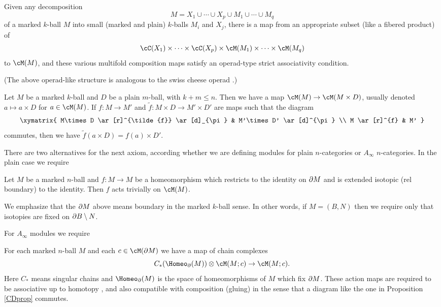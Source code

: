 {Given any decomposition 
\[
	M =  X_1 \cup\cdots\cup X_p \cup M_1\cup\cdots\cup M_q
\]
of a marked $k$-ball $M$
into small (marked and plain) $k$-balls $M_i$ and $X_j$, there is a 
map from an appropriate subset (like a fibered product) 
of 
\[
	\cC(X_1)\times\cdots\times\cC(X_p) \times \cM(M_1)\times\cdots\times\cM(M_q) 
\]
to $\cM(M)$,
and these various multifold composition maps satisfy an
operad-type strict associativity condition.}

(The above operad-like structure is analogous to the swiss cheese operad
\cite{MR1718089}.)

{Let $M$ be a marked $k$-ball and $D$ be a plain $m$-ball, with $k+m \le n$.
Then we have a map $\cM(M)\to \cM(M\times D)$, usually denoted $a\mapsto a\times D$ for $a\in \cM(M)$.
If $f:M\to M'$ and $\tilde{f}:M\times D \to M'\times D'$ are maps such that the diagram
\[ \xymatrix{
	M\times D \ar[r]^{\tilde{f}} \ar[d]_{\pi} & M'\times D' \ar[d]^{\pi} \\
	M \ar[r]^{f} & M'
} \]
commutes, then we have $\tilde{f}(a\times D) = f(a)\times D'$.}



There are two alternatives for the next axiom, according whether we are defining
modules for plain $n$-categories or $A_\infty$ $n$-categories.
In the plain case we require

{Let $M$ be a marked $n$-ball and $f: M\to M$ be a homeomorphism which restricts
to the identity on $\partial M$ and is extended isotopic (rel boundary) to the identity.
Then $f$ acts trivially on $\cM(M)$.}


We emphasize that the $\partial M$ above means boundary in the marked $k$-ball sense.
In other words, if $M = (B, N)$ then we require only that isotopies are fixed 
on $\partial B \setminus N$.

For $A_\infty$ modules we require

{For each marked $n$-ball $M$ and each $c\in \cM(\bd M)$ we have a map of chain complexes
\[
	C_*(\Homeo_\bd(M))\ot \cM(M; c) \to \cM(M; c) .
\]
Here $C_*$ means singular chains and $\Homeo_\bd(M)$ is the space of homeomorphisms of $M$
which fix $\partial M$.
These action maps are required to be associative up to homotopy
, and also compatible with composition (gluing) in the sense that
a diagram like the one in Proposition \ref{CDprop} commutes.
}

